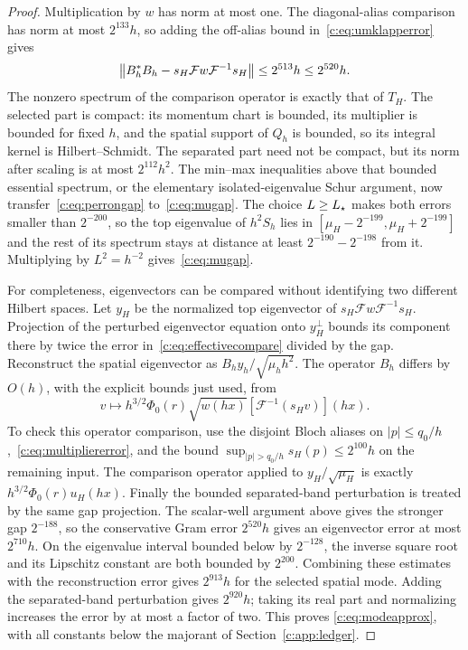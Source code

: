 \begin{proof}
Multiplication by $w$ has norm at most one. The diagonal-alias
comparison has norm at most $2^{133}h$, so adding the off-alias
bound in~\eqref{c:eq:umklapperror} gives
\begin{equation}
 \left\lVert B_h^*B_h-
 s_H\mathcal Fw\mathcal F^{-1}s_H\right\rVert\le2^{513}h\le2^{520}h.
                                                               \label{c:eq:effectivecompare}
\end{equation}
The nonzero spectrum of the comparison operator is exactly that of
$T_H$. The selected part is compact: its momentum chart is bounded,
its multiplier is bounded for fixed $h$, and the spatial support of
$Q_h$ is bounded, so its integral kernel is Hilbert--Schmidt.
The separated part need not be compact, but its norm after scaling is
at most $2^{112}h^2$. The min--max inequalities above that bounded
essential spectrum, or the elementary isolated-eigenvalue Schur
argument, now transfer~\eqref{c:eq:perrongap} to~\eqref{c:eq:mugap}.
The choice $L\ge L_\star$ makes both errors smaller than $2^{-200}$, so the
top eigenvalue of $h^2S_h$ lies in $[\mu_H-2^{-199},\mu_H+2^{-199}]$
and the rest of its spectrum stays at distance at least
$2^{-190}-2^{-198}$ from it. Multiplying by $L^2=h^{-2}$
gives~\eqref{c:eq:mugap}.

For completeness, eigenvectors can be compared without identifying two
different Hilbert spaces. Let $y_H$ be the normalized top eigenvector
of $s_H\mathcal Fw\mathcal F^{-1}s_H$. Projection of the perturbed
eigenvector equation onto $y_H^\perp$ bounds its component there by
twice the error in~\eqref{c:eq:effectivecompare} divided by the gap.
Reconstruct the spatial eigenvector as $B_hy_h/\sqrt{\mu_hh^2}$.
The operator $B_h$ differs by $O(h)$, with the explicit bounds just
used, from
\[
 v\longmapsto h^{3/2}\Phi_0(r)\sqrt{w(hx)}
       [\mathcal F^{-1}(s_Hv)](hx).
\]
To check this operator comparison, use the disjoint Bloch aliases on
$|p|\le q_0/h$,~\eqref{c:eq:multipliererror}, and the bound
$\sup_{|p|>q_0/h}s_H(p)\le2^{100}h$ on the remaining input.
The comparison operator applied to $y_H/\sqrt{\mu_H}$ is exactly
$h^{3/2}\Phi_0(r)u_H(hx)$. Finally the bounded separated-band
perturbation is treated by the same gap projection. The scalar-well
argument above gives the stronger gap $2^{-188}$, so the conservative
Gram error $2^{520}h$ gives an eigenvector error at most $2^{710}h$.
On the eigenvalue interval bounded below by $2^{-128}$, the inverse
square root and its Lipschitz constant are both bounded by $2^{200}$.
Combining these estimates with the reconstruction error gives
$2^{913}h$ for the selected spatial mode. Adding the separated-band
perturbation gives $2^{920}h$; taking its real part and normalizing
increases the error by at most a factor of two. This proves
\eqref{c:eq:modeapprox}, with all constants below the majorant of
Section~\ref{c:app:ledger}.


\end{proof}
